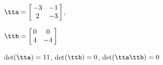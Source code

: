 {$\tta = \left[\hskip -3pt \begin{array}{cc} -3&-1\\  2&-3\end {array} \hskip -3pt
 \right] $, 

$\ttb = \left[\hskip -3pt \begin{array}{cc} 0&0\\  4&-4\end {array} \hskip -3pt
 \right]$}
{det$(\tta)=11$, det$(\ttb)=0$, det$(\tta\ttb)=0$}






  

